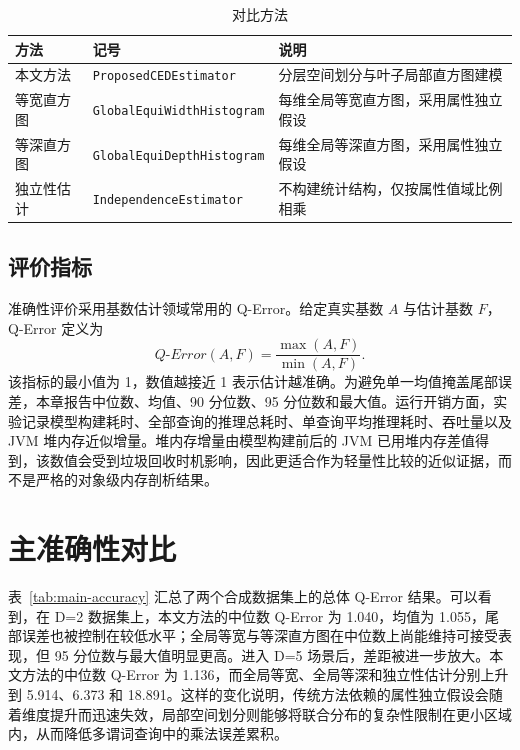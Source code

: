 \begin{table}[htbp]
  \centering
  \caption{对比方法}
  \label{tab:methods}
  \begin{tabular}{lll}
    \hline
    方法 & 记号 & 说明 \\
    \hline
    本文方法 & \texttt{ProposedCEDEstimator} & 分层空间划分与叶子局部直方图建模 \\
    等宽直方图 & \texttt{GlobalEquiWidthHistogram} & 每维全局等宽直方图，采用属性独立假设 \\
    等深直方图 & \texttt{GlobalEquiDepthHistogram} & 每维全局等深直方图，采用属性独立假设 \\
    独立性估计 & \texttt{IndependenceEstimator} & 不构建统计结构，仅按属性值域比例相乘 \\
    \hline
  \end{tabular}
\end{table}

\subsection{评价指标}

准确性评价采用基数估计领域常用的 Q-Error。给定真实基数 $A$ 与估计基数 $F$，Q-Error 定义为
\begin{equation}
  Q\text{-}Error(A,F)=\frac{\max(A,F)}{\min(A,F)} .
\end{equation}
该指标的最小值为 1，数值越接近 1 表示估计越准确。为避免单一均值掩盖尾部误差，本章报告中位数、均值、90 分位数、95 分位数和最大值。运行开销方面，实验记录模型构建耗时、全部查询的推理总耗时、单查询平均推理耗时、吞吐量以及 JVM 堆内存近似增量。堆内存增量由模型构建前后的 JVM 已用堆内存差值得到，该数值会受到垃圾回收时机影响，因此更适合作为轻量性比较的近似证据，而不是严格的对象级内存剖析结果。

\section{主准确性对比}

表~\ref{tab:main-accuracy} 汇总了两个合成数据集上的总体 Q-Error 结果。可以看到，在 D=2 数据集上，本文方法的中位数 Q-Error 为 1.040，均值为 1.055，尾部误差也被控制在较低水平；全局等宽与等深直方图在中位数上尚能维持可接受表现，但 95 分位数与最大值明显更高。进入 D=5 场景后，差距被进一步放大。本文方法的中位数 Q-Error 为 1.136，而全局等宽、全局等深和独立性估计分别上升到 5.914、6.373 和 18.891。这样的变化说明，传统方法依赖的属性独立假设会随着维度提升而迅速失效，局部空间划分则能够将联合分布的复杂性限制在更小区域内，从而降低多谓词查询中的乘法误差累积。

